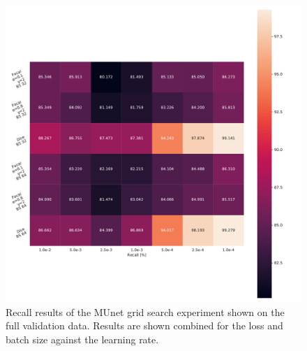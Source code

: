 \begin{figure}[H]
\begin{center}
    \includegraphics[width=\columnwidth]{imgs/munet_grid_heat_R_B.pdf}
    \caption{Recall results of the \ac{MUnet} grid search experiment shown on the full validation data. Results are shown combined for the loss and batch size against the learning rate.}
    \label{fig:munet_rb_heat}
\end{center}
\end{figure}

